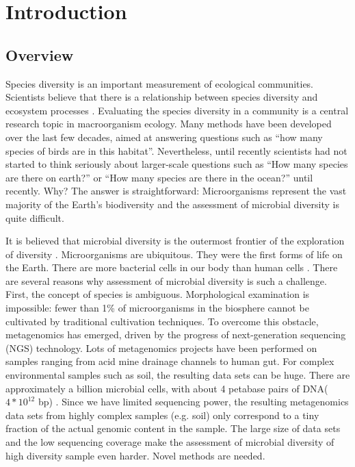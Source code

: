 \chapter{Introduction}

\section{Overview} Species diversity is an important measurement of ecological
communities. Scientists believe that there is a relationship between species
diversity and ecosystem processes \cite{Loreau:2001aa}. Evaluating the species
diversity in a community is a central research topic in macroorganism ecology.
Many methods have been developed over the last few decades, aimed at answering
questions such as ``how many species of birds are in this habitat''.
Nevertheless, until recently scientists had not started to think seriously
about larger-scale questions such as ``How many species are there on earth?''
\cite{May:1988aa} or ``How many species are there in the ocean?''
\cite{Mora:2011aa} until recently. Why? The answer is straightforward:
Microorganisms represent the vast majority of the Earth's biodiversity and the
assessment of microbial diversity is quite difficult.

It is believed that microbial diversity is the outermost frontier of the
exploration of diversity \cite{magurran2011biological}. Microorganisms are
ubiquitous. They were the first forms of life on the Earth. There are more
bacterial cells in our body than human cells \cite{Savage:1977aa}. 
There are several reasons why assessment of microbial diversity is such a
challenge. First, the concept of species is ambiguous. Morphological
examination is impossible: fewer than 1\% of microorganisms  in the biosphere
cannot be cultivated by traditional cultivation
techniques\cite{Curtis:2002aa}. To overcome this obstacle, metagenomics has
emerged, driven by the progress of next-generation sequencing (NGS) technology.
Lots of metagenomics projects have been performed on samples ranging from acid
mine drainage channels to human gut. For complex environmental samples such as
soil, the resulting data sets can be huge. There are approximately a billion
microbial cells, with about 4 petabase pairs of DNA($4*{10}^{12}$ bp)
\cite{Zarraonaindia:2013aa}. Since we have limited sequencing power, the
resulting metagenomics data sets from highly complex samples (e.g. soil) only
correspond to a tiny fraction of the actual genomic content in the sample. The
large size of data sets and the low sequencing coverage make the assessment of
microbial diversity of high diversity sample even harder. Novel methods are
needed.


